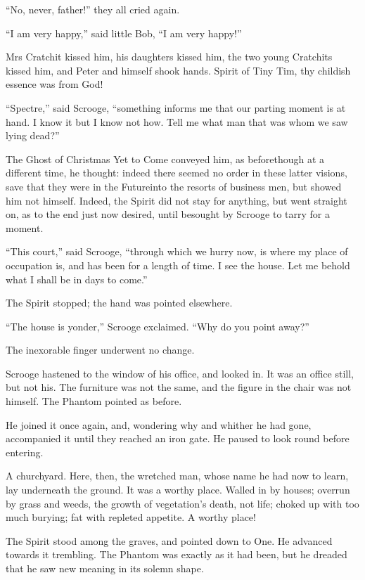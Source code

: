 \documentclass[paper=5.5in:8.5in,BCOR=10mm,twoside,DIV=15,12pt,usegeometry,openany]{scrbook} %
\begin{document}
\enquote{No, never, father!} they all cried again.

\enquote{I am very happy,} said little Bob, \enquote{I am very happy!}

Mrs Cratchit kissed him, his daughters kissed him, the two young Cratchits kissed him, and Peter and himself shook hands. Spirit of Tiny Tim, thy childish essence was from God!

\enquote{Spectre,} said Scrooge, \enquote{something informs me that our parting moment is at hand. I know it but I know not how. Tell me what man that was whom we saw lying dead?}

The Ghost of Christmas Yet to Come conveyed him, as before\textemdash though at a different time, he thought: indeed there seemed no order in these latter visions, save that they were in the Future\textemdash into the resorts of business men, but showed him not himself. Indeed, the Spirit did not stay for anything, but went straight on, as to the end just now desired, until besought by Scrooge to tarry for a moment.

\enquote{This court,} said Scrooge, \enquote{through which we hurry now, is where my place of occupation is, and has been for a length of time. I see the house. Let me behold what I shall be in days to come.}

The Spirit stopped; the hand was pointed elsewhere.

\enquote{The house is yonder,} Scrooge exclaimed. \enquote{Why do you point away?}

The inexorable finger underwent no change.

Scrooge hastened to the window of his office, and looked in. It was an office still, but not his. The furniture was not the same, and the figure in the chair was not himself. The Phantom pointed as before.

He joined it once again, and, wondering why and whither he had gone, accompanied it until they reached an iron gate. He paused to look round before entering.

A churchyard. Here, then, the wretched man, whose name he had now to learn, lay underneath the ground. It was a worthy place. Walled in by houses; overrun by grass and weeds, the growth of vegetation's death, not life; choked up with too much burying; fat with repleted appetite. A worthy place!

The Spirit stood among the graves, and pointed down to One. He advanced towards it trembling. The Phantom was exactly as it had been, but he dreaded that he saw new meaning in its solemn shape.
\end{document}
